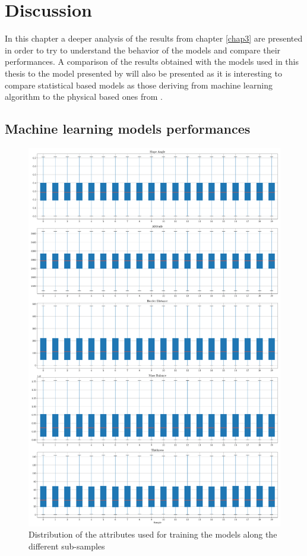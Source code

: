 \chapter{Discussion}\label{disc}
\thispagestyle{plain}
In this chapter a deeper analysis of the results from chapter \ref{chap3} are presented in order to try to understand the behavior of the models and compare their performances. A comparison of the results obtained with the models used in this thesis to the model presented by \cite{Farinotti2019} will also be presented as it is interesting to compare statistical based models as those deriving from machine learning algorithm to the physical based ones from  \cite{Farinotti2019}.

\section{Machine learning models performances}\label{MLcomp}

\begin{figure}[p]
	\centering		  
	\includegraphics[width=1.\textwidth]{figures/samples_distribution.pdf}
	\caption{Distribution of the attributes used for training the models along the different sub-samples}
	\label{fig:distribution}
\end{figure}

